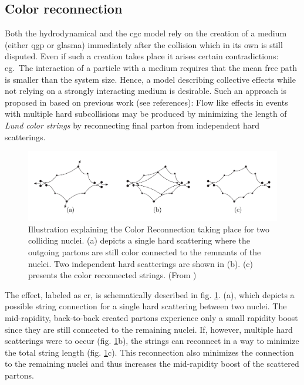 \subsection{Color reconnection}
\label{sec:CR}
Both the hydrodynamical and the \gls{cgc} model rely on the creation of a medium (either \gls{qgp} or glasma) immediately after the collision which in its own is still disputed. Even if such a creation takes place it arises certain contradictions: eg.\ The interaction of a particle with a medium requires that the mean free path is smaller than the system size. Hence, a model describing collective effects while not relying on a strongly interacting medium is desirable. Such an approach is proposed in \cite{Ortiz2013} based on previous work (see references): Flow like effects in events with multiple hard subcollisions may be produced by minimizing the length of \emph{Lund color strings} by reconnecting final parton from independent hard scatterings. 
\begin{figure}
  \centering
  \includegraphics[width=.8\textwidth]{figures/CR.png}
  \caption[Illustration explaining the Color Reconnection taking place for two colliding nuclei.]{Illustration explaining the Color Reconnection taking place for two colliding nuclei. (a) depicts a single hard scattering where the outgoing partons are still color connected to the remnants of the nuclei. Two independent hard scatterings are shown in (b). (c) presents the color reconnected strings. (From \cite{Gustafson2009})}
  \label{fig:cr}
\end{figure}

The effect, labeled as \gls{cr}, is schematically described in fig. \ref{fig:cr}. (a), which depicts a possible string connection for a single hard scattering between two nuclei. The mid-rapidity, back-to-back created partons experience only a small rapidity boost since they are still connected to the remaining nuclei. If, however, multiple hard scatterings were to occur (fig. \ref{fig:cr}b), the strings can  reconnect in a way to minimize the total string length (fig. \ref{fig:cr}c). This reconnection also minimizes the connection to the remaining nuclei and thus increases the mid-rapidity boost of the scattered partons.\\

